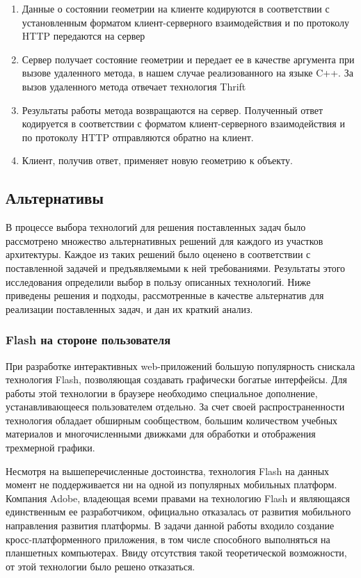 \documentclass[12pt, a4paper]{article}
\begin{document}
\begin{enumerate}
    \item Данные о состоянии геометрии на клиенте кодируются в соответствии с
    установленным форматом клиент-серверного взаимодействия и по протоколу HTTP
    передаются на сервер
    \item Сервер получает состояние геометрии и передает ее в качестве аргумента
    при вызове удаленного метода, в нашем случае реализованного на языке C++.
    За вызов удаленного метода отвечает технология Thrift
    \item Результаты работы метода возвращаются на сервер. Полученный ответ
    кодируется в соответствии с форматом клиент-серверного взаимодействия и по
    протоколу HTTP отправляются обратно на клиент.
    \item Клиент, получив ответ, применяет новую геометрию к объекту.
\end{enumerate}


\subsection{Альтернативы}

В процессе выбора технологий для решения поставленных задач было
рассмотрено множество альтернативных решений для каждого из участков
архитектуры. Каждое из таких решений было оценено в соответствии с
поставленной задачей и предъявляемыми к ней требованиями. Результаты
этого исследования определили выбор в пользу описанных технологий. Ниже
приведены решения и подходы, рассмотренные в качестве альтернатив для
реализации поставленных задач, и дан их краткий анализ.

\subsubsection{Flash на стороне пользователя}

При разработке интерактивных web-приложений большую популярность снискала
технология Flash, позволяющая создавать графически богатые интерфейсы. Для
работы этой технологии в браузере необходимо специальное дополнение,
устанавливающееся пользователем отдельно. За счет
своей распространенности технология обладает обширным сообществом, большим
количеством учебных материалов и многочисленными движками для обработки и
отображения трехмерной графики.

Несмотря на вышеперечисленные достоинства, технология Flash на данных момент не
поддерживается ни на одной из популярных мобильных платформ. Компания Adobe,
владеющая всеми правами на технологию Flash и являющаяся единственным ее
разработчиком, официально отказалась от развития мобильного направления развития
платформы. В задачи данной работы входило создание кросс-платформенного
приложения, в том числе способного выполняться на планшетных компьютерах. Ввиду
отсутствия такой теоретической возможности, от этой технологии было решено
отказаться.
\end{document}
